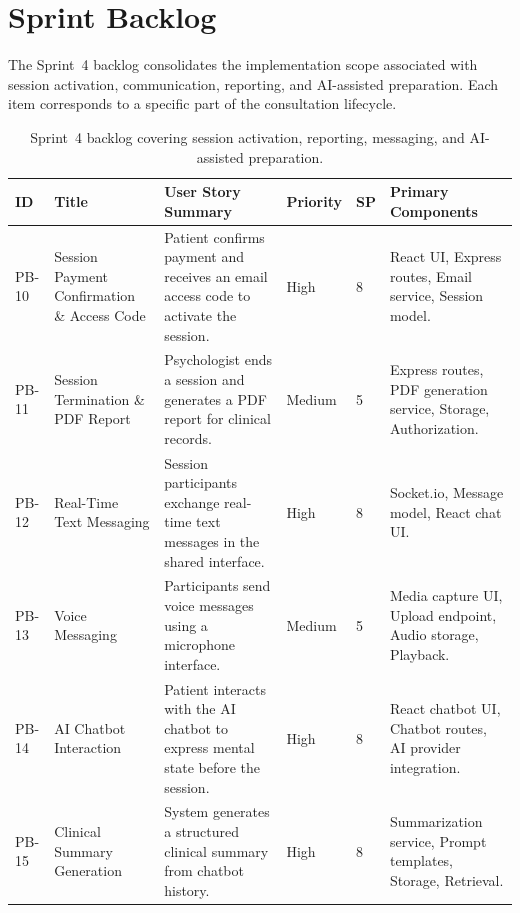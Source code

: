 \documentclass[a4paper,12pt]{report}
\begin{document}
\section{Sprint Backlog}
The Sprint~4 backlog consolidates the implementation scope associated with session activation, communication, reporting, and AI-assisted preparation. Each item corresponds to a specific part of the consultation lifecycle.

\begin{table}[H]
\centering
\small
\begin{tabular}{@{} L{0.07\textwidth} L{0.14\textwidth} L{0.30\textwidth} C{0.11\textwidth} C{0.06\textwidth} L{0.16\textwidth} @{}}
\toprule
\textbf{ID} &
\textbf{Title} &
\textbf{User Story Summary} &
\textbf{Priority} &
\textbf{SP} &
\textbf{Primary Components} \\
\midrule
PB-10 &
Session Payment Confirmation \& Access Code &
Patient confirms payment and receives an email access code to activate the session. &
High &
8 &
React UI, Express routes, Email service, Session model. \\
PB-11 &
Session Termination \& PDF Report &
Psychologist ends a session and generates a PDF report for clinical records. &
Medium &
5 &
Express routes, PDF generation service, Storage, Authorization. \\
PB-12 &
Real-Time Text Messaging &
Session participants exchange real-time text messages in the shared interface. &
High &
8 &
Socket.io, Message model, React chat UI. \\
PB-13 &
Voice Messaging &
Participants send voice messages using a microphone interface. &
Medium &
5 &
Media capture UI, Upload endpoint, Audio storage, Playback. \\
PB-14 &
AI Chatbot Interaction &
Patient interacts with the AI chatbot to express mental state before the session. &
High &
8 &
React chatbot UI, Chatbot routes, AI provider integration. \\
PB-15 &
Clinical Summary Generation &
System generates a structured clinical summary from chatbot history. &
High &
8 &
Summarization service, Prompt templates, Storage, Retrieval. \\
\bottomrule
\end{tabular}
\caption{Sprint~4 backlog covering session activation, reporting, messaging, and AI-assisted preparation.}
\label{tab:sprint4-backlog}
\end{table}
\end{document}
